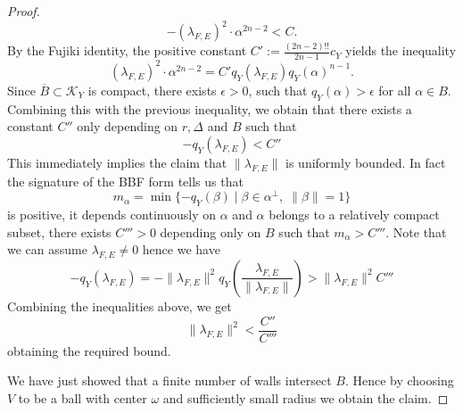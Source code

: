 \documentclass[12pt,a4paper]{amsart}
\theoremstyle{plain}
\theoremstyle{definition}
\theoremstyle{remark}
\begin{document}
\begin{proof}
\[
-\left(\lambda_{F,E}\right)^2\cdot\alpha^{2n-2}< C.
\]
By the Fujiki identity, the positive constant $C':=\frac{(2n-2)!!}{2n-1}c_Y$ yields the inequality
\[
    \left(\lambda_{F,E}\right)^2\cdot\alpha^{2n-2}=C'q_Y(\lambda_{F,E})q_Y(\alpha)^{n-1}.
\]
Since $\overline{B}\subset\mathcal{K}_Y$ is compact, there exists $\epsilon>0$, such that $q_Y(\alpha)>\epsilon$ for all $\alpha\in B$. Combining this with the previous inequality, we obtain that there exists a constant $C''$ only depending on $r,\Delta$ and $B$ such that
\[
-q_Y(\lambda_{F,E})<C''
\]
This immediately implies the claim that $\lVert \lambda_{F,E}\rVert$ is uniformly bounded. In fact the signature of the BBF form tells us that 
\[
m_\alpha=\min\{-q_Y(\beta)\;|\;\beta\in\alpha^\perp,\; \lVert \beta\rVert= 1\}
\]
is positive, it depends continuously on $\alpha$ and $\alpha$ belongs to a relatively compact subset, there exists $C'''>0$ depending only on $B$ such that $m_\alpha>C'''$. 
Note that we can assume $\lambda_{F,E}\neq 0$ hence we have
\[
-q_Y(\lambda_{F,E})=-\lVert \lambda_{F,E}\rVert^2q_Y\left(\frac{\lambda_{F,E}}{\lVert \lambda_{F,E}\rVert}\right)>\lVert \lambda_{F,E}\rVert^2C'''
\]
Combining the inequalities above, we get
\[
\lVert \lambda_{F,E}\rVert^2<\frac{C''}{C'''}
\]
obtaining the required bound. 

We have just showed that  a finite number of walls intersect $B$. 
Hence by choosing $V$ to be a ball with center $\omega$ and sufficiently small radius we obtain the claim.
\end{proof}
\end{document}
